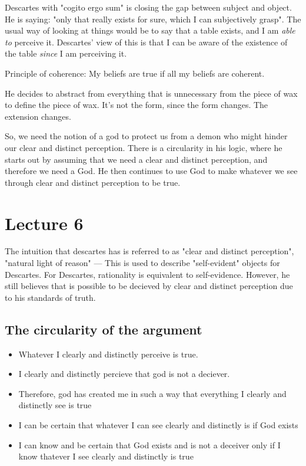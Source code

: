 \documentclass[11pt]{book}
\begin{document}
Descartes with "cogito ergo sum" is closing the gap between subject and object.
He is saying: "only that really exists for sure, which I can subjectively
grasp". The usual way of looking at things would be to say that a table exists,
and I am \textit{able to} perceive it. Descartes' view of this is that I can be
aware of the existence of the table \textit{since} I am perceiving it.

Principle of coherence: My beliefs are true if all my beliefs are coherent.

He decides to abstract from everything that is unnecessary from the piece of
wax to define the piece of wax. It's not the form, since the form changes. The
extension changes.


So, we need the notion of a god to protect us from a demon who might hinder our
clear and distinct perception. There is a circularity in his logic, where he
starts out by assuming that we need a clear and distinct perception, and
therefore we need a God. He then continues to use God to make whatever we see
through clear and distinct perception to be true.

\section{Lecture 6}

The intuition that descartes has is referred to as "clear and distinct perception",
"natural light of reason" --- This is used to describe "self-evident" objects
for Descartes. For Descartes, rationality is equivalent to self-evidence.
However, he still believes that is possible to be decieved by clear
and distinct perception due to his standards of truth.

\subsection{The circularity of the argument}

\begin{itemize}
    \item Whatever I clearly and distinctly perceive is true.
    \item I clearly and distinctly percieve that god is not a deciever.
    \item Therefore, god has created me in such a way that everything I clearly and distinctly see is true
\end{itemize}

\begin{itemize}
    \item I can be certain that whatever I can see clearly and distinctly is if
        God exists
    \item I can know and be certain that God exists and is not a deceiver only
        if I know thatever I see clearly and distinctly is true
\end{itemize}
\end{document}
